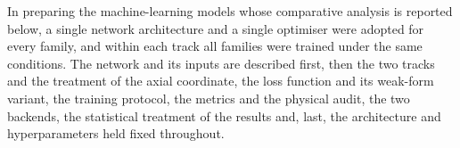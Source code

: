 \label{sec:models}
In preparing the machine-learning models whose comparative analysis is reported
below, a single network architecture and a single optimiser were adopted for
every family, and within each track all families were trained under the same
conditions. The network and its inputs are described first, then the two tracks
and the treatment of the axial coordinate, the loss function and its weak-form
variant, the training protocol, the metrics and the physical audit, the two
backends, the statistical treatment of the results and, last, the architecture
and hyperparameters held fixed throughout.

